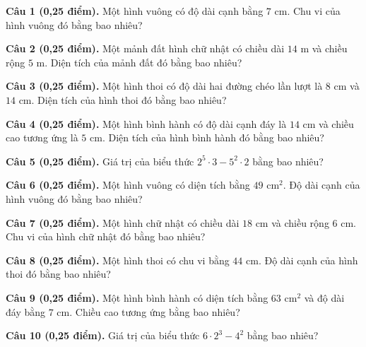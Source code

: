 \documentclass[12pt,a4paper]{article}
\begin{document}
\noindent\textbf{Câu 1 (0,25 điểm).} Một hình vuông có độ dài cạnh bằng $7\text{ cm}$. Chu vi của hình vuông đó bằng bao nhiêu? \par\vspace{0.3mm}
\noindent\textbf{Câu 2 (0,25 điểm).} Một mảnh đất hình chữ nhật có chiều dài $14\text{ m}$ và chiều rộng $5\text{ m}$. Diện tích của mảnh đất đó bằng bao nhiêu? \par\vspace{0.3mm}
\noindent\textbf{Câu 3 (0,25 điểm).} Một hình thoi có độ dài hai đường chéo lần lượt là $8\text{ cm}$ và $14\text{ cm}$. Diện tích của hình thoi đó bằng bao nhiêu? \par\vspace{0.3mm}
\noindent\textbf{Câu 4 (0,25 điểm).} Một hình bình hành có độ dài cạnh đáy là $14\text{ cm}$ và chiều cao tương ứng là $5\text{ cm}$. Diện tích của hình bình hành đó bằng bao nhiêu? \par\vspace{0.3mm}
\noindent\textbf{Câu 5 (0,25 điểm).} Giá trị của biểu thức $2^5 \cdot 3 - 5^2 \cdot 2$ bằng bao nhiêu? \par\vspace{0.3mm}
\noindent\textbf{Câu 6 (0,25 điểm).} Một hình vuông có diện tích bằng $49\text{ cm}^2$. Độ dài cạnh của hình vuông đó bằng bao nhiêu? \par\vspace{0.3mm}
\noindent\textbf{Câu 7 (0,25 điểm).} Một hình chữ nhật có chiều dài $18\text{ cm}$ và chiều rộng $6\text{ cm}$. Chu vi của hình chữ nhật đó bằng bao nhiêu? \par\vspace{0.3mm}
\noindent\textbf{Câu 8 (0,25 điểm).} Một hình thoi có chu vi bằng $44\text{ cm}$. Độ dài cạnh của hình thoi đó bằng bao nhiêu? \par\vspace{0.3mm}
\noindent\textbf{Câu 9 (0,25 điểm).} Một hình bình hành có diện tích bằng $63\text{ cm}^2$ và độ dài đáy bằng $7\text{ cm}$. Chiều cao tương ứng bằng bao nhiêu? \par\vspace{0.3mm}
\noindent\textbf{Câu 10 (0,25 điểm).} Giá trị của biểu thức $6 \cdot 2^3 - 4^2$ bằng bao nhiêu? \par\vspace{0.3mm}
\vspace{0.4mm}
\end{document}
